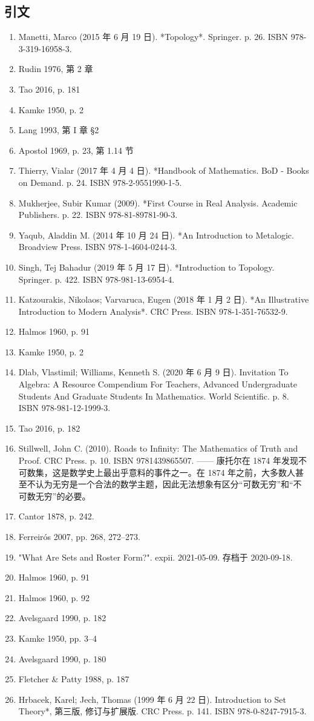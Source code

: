\subsection{引文}
\begin{enumerate}
\item Manetti, Marco (2015 年 6 月 19 日). *Topology*. Springer. p. 26. ISBN 978-3-319-16958-3.
\item Rudin 1976, 第 2 章
\item Tao 2016, p. 181
\item Kamke 1950, p. 2
\item Lang 1993, 第 I 章 §2
\item Apostol 1969, p. 23, 第 1.14 节
\item Thierry, Vialar (2017 年 4 月 4 日). *Handbook of Mathematics. BoD - Books on Demand. p. 24. ISBN 978-2-9551990-1-5.
\item Mukherjee, Subir Kumar (2009). *First Course in Real Analysis. Academic Publishers. p. 22. ISBN 978-81-89781-90-3.
\item Yaqub, Aladdin M. (2014 年 10 月 24 日). *An Introduction to Metalogic. Broadview Press. ISBN 978-1-4604-0244-3.
\item Singh, Tej Bahadur (2019 年 5 月 17 日). *Introduction to Topology. Springer. p. 422. ISBN 978-981-13-6954-4.
\item Katzourakis, Nikolaos; Varvaruca, Eugen (2018 年 1 月 2 日). *An Illustrative Introduction to Modern Analysis*. CRC Press. ISBN 978-1-351-76532-9.
\item Halmos 1960, p. 91
\item Kamke 1950, p. 2
\item Dlab, Vlastimil; Williams, Kenneth S. (2020 年 6 月 9 日). Invitation To Algebra: A Resource Compendium For Teachers, Advanced Undergraduate Students And Graduate Students In Mathematics. World Scientific. p. 8. ISBN 978-981-12-1999-3.
\item Tao 2016, p. 182
\item Stillwell, John C. (2010). Roads to Infinity: The Mathematics of Truth and Proof. CRC Press. p. 10. ISBN 9781439865507. —— 康托尔在 1874 年发现不可数集，这是数学史上最出乎意料的事件之一。在 1874 年之前，大多数人甚至不认为无穷是一个合法的数学主题，因此无法想象有区分“可数无穷”和“不可数无穷”的必要。
\item Cantor 1878, p. 242.
\item Ferreirós 2007, pp. 268, 272–273.
\item "What Are Sets and Roster Form?". expii. 2021-05-09. 存档于 2020-09-18.
\item Halmos 1960, p. 91
\item Halmos 1960, p. 92
\item Avelsgaard 1990, p. 182
\item Kamke 1950, pp. 3–4
\item Avelsgaard 1990, p. 180
\item Fletcher & Patty 1988, p. 187
\item Hrbacek, Karel; Jech, Thomas (1999 年 6 月 22 日). Introduction to Set Theory*, 第三版, 修订与扩展版. CRC Press. p. 141. ISBN 978-0-8247-7915-3.
\end{enumerate}

